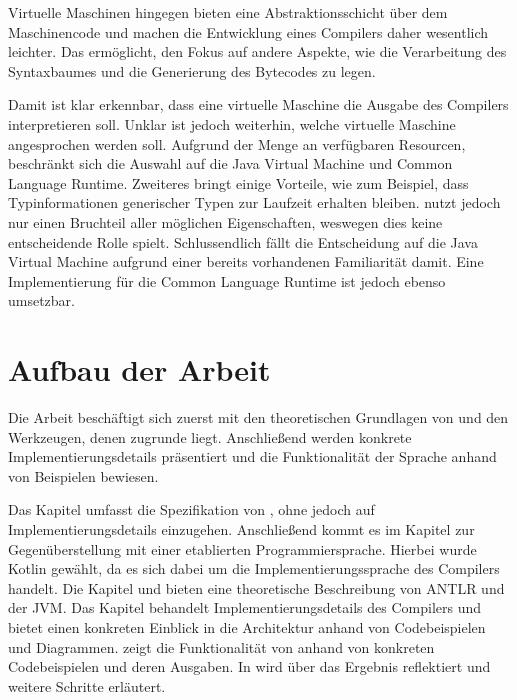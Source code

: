 Virtuelle Maschinen hingegen bieten eine Abstraktionsschicht über dem Maschinencode und machen die Entwicklung eines Compilers daher wesentlich leichter. Das ermöglicht, den Fokus auf andere Aspekte, wie die Verarbeitung des Syntaxbaumes und die Generierung des Bytecodes zu legen.

Damit ist klar erkennbar, dass eine virtuelle Maschine die Ausgabe des Compilers interpretieren soll. Unklar ist jedoch weiterhin, welche virtuelle Maschine angesprochen werden soll. Aufgrund der Menge an verfügbaren Resourcen, beschränkt sich die Auswahl auf die Java Virtual Machine und Common Language Runtime. Zweiteres bringt einige Vorteile, wie zum Beispiel, dass Typinformationen generischer Typen zur Laufzeit erhalten bleiben. \Toya nutzt jedoch nur einen Bruchteil aller möglichen Eigenschaften, weswegen dies keine entscheidende Rolle spielt. Schlussendlich fällt die Entscheidung auf die Java Virtual Machine aufgrund einer bereits vorhandenen Familiarität damit. Eine Implementierung für die Common Language Runtime ist jedoch ebenso umsetzbar.

\section{Aufbau der Arbeit}

Die Arbeit beschäftigt sich zuerst mit den theoretischen Grundlagen von \toya und den Werkzeugen, denen \toya zugrunde liegt. Anschließend werden konkrete Implementierungsdetails präsentiert und die Funktionalität der Sprache anhand von Beispielen bewiesen.

Das Kapitel  umfasst die Spezifikation von \toya, ohne jedoch auf Implementierungsdetails einzugehen. Anschließend kommt es im Kapitel  zur Gegenüberstellung mit einer etablierten Programmiersprache. Hierbei wurde Kotlin gewählt, da es sich dabei um die Implementierungssprache des \toya Compilers handelt. Die Kapitel  und  bieten eine theoretische Beschreibung von ANTLR und der JVM. Das Kapitel  behandelt Implementierungsdetails des Compilers und bietet einen konkreten Einblick in die Architektur anhand von Codebeispielen und Diagrammen.  zeigt die Funktionalität von \toya anhand von konkreten Codebeispielen und deren Ausgaben. In  wird über das Ergebnis reflektiert und weitere Schritte erläutert.